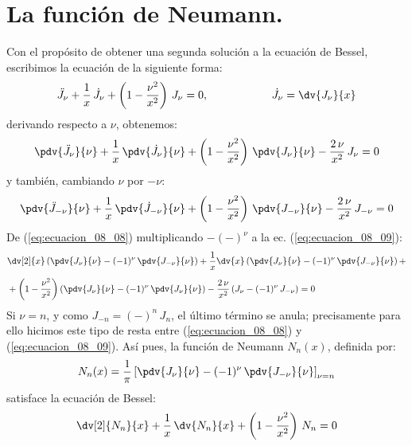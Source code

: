 \section{La función de Neumann.}
Con el propósito de obtener una segunda solución a la ecuación de Bessel, escribimos la ecuación de la siguiente forma:
\begin{align*}
\ddot{J}_{\nu} + \dfrac{1}{x} \, \dot{J}_{\nu}  + \left( 1 - \dfrac{\nu^{2}}{x^{2}} \right) \, J_{\nu} = 0, \hspace{2cm} \dot{J}_{\nu} =  \dv{J_{\nu}}{x}
\end{align*}
derivando respecto a $\nu$, obtenemos:
\begin{align}
\pdv{\ddot{J}_{\nu}}{\nu} + \dfrac{1}{x} \, \pdv{\dot{J}_{\nu}}{\nu} + \left( 1 - \dfrac{\nu^{2}}{x^{2}} \right) \, \pdv{J_{\nu}}{\nu} - \dfrac{2  \, \nu}{x^{2}} \, J_{\nu} = 0
\label{eq:ecuacion_08_08} 
\end{align}
y también, cambiando $\nu$ por $-\nu$:
\begin{align}
\pdv{\ddot{J}_{-\nu}}{\nu} + \dfrac{1}{x} \, \pdv{\dot{J}_{-\nu}}{\nu} + \left( 1 - \dfrac{\nu^{2}}{x^{2}} \right) \, \pdv{J_{-\nu}}{\nu} - \dfrac{2 \, \nu}{x^{2}} \, J_{-\nu} = 0
\label{eq:ecuacion_08_09} 
\end{align}
De (\ref{eq:ecuacion_08_08}) multiplicando $-(-)^{\nu}$ a la ec. (\ref{eq:ecuacion_08_09}):
\begin{align*}
&\dv[2]{x} \left( \pdv{J_{\nu}}{\nu} - (-1)^{\nu} \, \pdv{J_{-\nu}}{\nu} \right) + \dfrac{1}{x} \dv{x} \left( \pdv{J_{\nu}}{\nu} - (-1)^{\nu} \,\pdv{J_{-\nu}}{\nu} \right) + \\[0.5em]
&+ \left( 1 - \dfrac{\nu^{2}}{x^{2}} \right) \left( \pdv{J_{\nu}}{\nu} - (-1)^{\nu}  \, \pdv{J_{\nu}}{\nu} \right) - \dfrac{2 \, \nu}{x^{2}} \, (J_{\nu} - (-1)^{\nu} \, J_{-\nu}) = 0
\end{align*}
Si $\nu = n$, y como $J_{-n} = (-)^{n} \, J_{n}$, el último término se anula; precisamente para ello hicimos este tipo de resta entre (\ref{eq:ecuacion_08_08}) y (\ref{eq:ecuacion_08_09}). Así pues, la función de Neumann $N_{n}(x)$, definida por:
\begin{align}
N_{n} (x) = \dfrac{1}{\pi} \left[ \pdv{J_{\nu}}{\nu} - (-1)^{\nu} \, \pdv{J_{-\nu}}{\nu} \right]_{\nu = n}
\label{eq:ecuacion_08_10}
\end{align}
satisface la ecuación de Bessel:
\begin{align*}
\dv[2]{N_{n}}{x} + \dfrac{1}{x} \, \dv{N_{n}}{x} + \left( 1 - \dfrac{\nu^{2}}{x^{2}} \right) \, N_{n} = 0
\end{align*}
